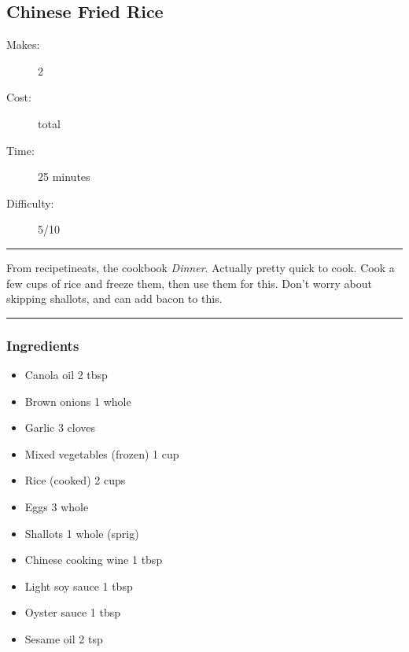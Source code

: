 \documentclass[]{article}
\begin{document}
\subsection*{\center\huge Chinese Fried Rice}
\begin{description}
\item[Makes:] 2 
\item[Cost:]  total
\item[Time:] 25 minutes
\item[Difficulty:] 5/10
\end{description}
\vspace{0.2cm}\hrule\vspace{0.5cm}
\begin{adjustwidth}{0.5 cm}{0.5 cm}

From recipetineats, the cookbook \textit{Dinner}. Actually pretty quick to cook. Cook a few cups of rice and freeze them, then use them for this. Don't worry about skipping shallots, and can add bacon to this. \hfill{}\color{black}

\end{adjustwidth}
\vspace{0.5cm}\hrule
\subsubsection*{\Large Ingredients}
\begin{multicols}{2}
\begin{itemize}
 \item Canola oil \hfill 2 tbsp
 \item Brown onions \hfill 1 whole
 \item Garlic \hfill 3 cloves
 \item Mixed vegetables (frozen) \hfill 1 cup
 \item Rice (cooked) \hfill 2 cups
 \item Eggs \hfill 3 whole
 \item Shallots \hfill 1 whole (sprig)
 \item Chinese cooking wine \hfill 1 tbsp
 \item Light soy sauce \hfill 1 tbsp
 \item Oyster sauce \hfill 1 tbsp
 \item Sesame oil \hfill 2 tsp
\end{itemize}
\end{multicols}
\end{document}
